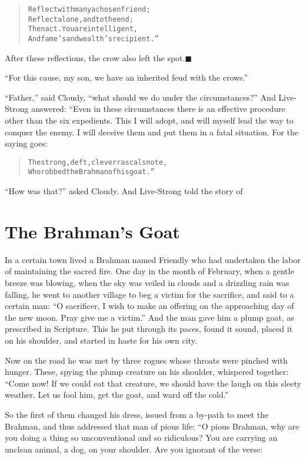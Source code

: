 \documentclass[article, twoside, 14pt]{memoir}
\newcommand{\qed}{\hfill \ensuremath{\blacksquare}}
\renewenvironment{verbatim}{%
\begin{quote}%
\vskip -10pt%
\begin{alltt}\normalfont\large}{\end{alltt}%
\end{quote}%
\vskip -10pt
} %
\begin{document}
\begin{verbatim}
Reflect with many a chosen friend;
Reflect alone, and to the end;
Then act. You are intelligent,
And fame's and wealth's recipient.”
\end{verbatim}
After these reflections, the crow also left the
spot.\hyperref[s48]{\qed}

``For this cause, my son, we have an inherited feud with the crows.''

``Father,'' said Cloudy,
``what should we do under the circumstances?'' And Live-Strong
answered: “Even in these circumstances there is an effective
procedure other than the six expedients. This I will adopt, and
will myself lead the way to conquer the enemy. I will deceive them
and put them in a fatal situation. For the saying goes:

\begin{verbatim}
The strong, deft, clever rascals note,
Who robbed the Brahman of his goat.”
\end{verbatim}
``How was that?'' asked Cloudy. And Live-Strong told the story of

\chapter{The Brahman's Goat}

\label{s51}

In a certain town lived a Brahman named Friendly who had undertaken
the labor of maintaining the sacred fire. One day in the month of
February, when a gentle breeze was blowing, when the sky was veiled
in clouds and a drizzling rain was falling, he went to another
village to beg a victim for the sacrifice, and said to a certain
man:
``O sacrificer, I wish to make an offering on the approaching day of the new moon. Pray give me a victim.''
And the man gave him a plump goat, as prescribed in Scripture. This
he put through its paces, found it sound, placed it on his
shoulder, and started in haste for his own city.

Now on the road he was met by three rogues whose throats were
pinched with hunger. These, spying the plump creature on his
shoulder, whispered together:
``Come now! If we could eat that creature, we should have the laugh on this sleety weather. Let us fool him, get the goat, and ward off the cold.''

So the first of them changed his dress, issued from a by-path to
meet the Brahman, and thus addressed that man of pious life: “O
pious Brahman, why are you doing a thing so unconventional and so
ridiculous? You are carrying an unclean animal, a dog, on your
shoulder. Are you ignorant of the verse:
\end{document}
